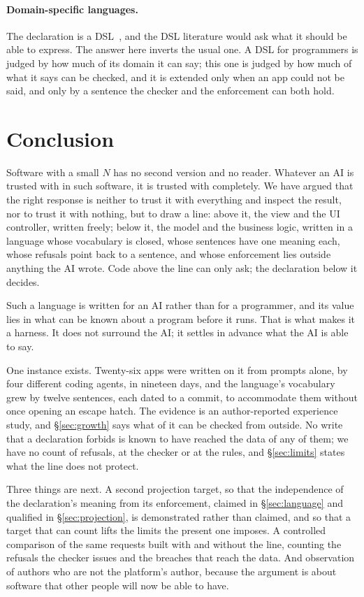 \documentclass[11pt]{article}
\begin{document}
\paragraph{Domain-specific languages.} The declaration is a DSL~\cite{mernik2005dsl,fowler2010dsl}, and the DSL literature would ask what it should be able to express. The answer here inverts the usual one. A DSL for programmers is judged by how much of its domain it can say; this one is judged by how much of what it says can be checked, and it is extended only when an app could not be said, and only by a sentence the checker and the enforcement can both hold.

\section{Conclusion}
\label{sec:conclusion}

Software with a small $N$ has no second version and no reader. Whatever an AI is trusted with in such software, it is trusted with completely. We have argued that the right response is neither to trust it with everything and inspect the result, nor to trust it with nothing, but to draw a line: above it, the view and the UI controller, written freely; below it, the model and the business logic, written in a language whose vocabulary is closed, whose sentences have one meaning each, whose refusals point back to a sentence, and whose enforcement lies outside anything the AI wrote. Code above the line can only ask; the declaration below it decides.

Such a language is written for an AI rather than for a programmer, and its value lies in what can be known about a program before it runs. That is what makes it a harness. It does not surround the AI; it settles in advance what the AI is able to say.

One instance exists. Twenty-six apps were written on it from prompts alone, by four different coding agents, in nineteen days, and the language's vocabulary grew by twelve sentences, each dated to a commit, to accommodate them without once opening an escape hatch. The evidence is an author-reported experience study, and \S\ref{sec:growth} says what of it can be checked from outside. No write that a declaration forbids is known to have reached the data of any of them; we have no count of refusals, at the checker or at the rules, and \S\ref{sec:limits} states what the line does not protect.

Three things are next. A second projection target, so that the independence of the declaration's meaning from its enforcement, claimed in \S\ref{sec:language} and qualified in \S\ref{sec:projection}, is demonstrated rather than claimed, and so that a target that can count lifts the limits the present one imposes. A controlled comparison of the same requests built with and without the line, counting the refusals the checker issues and the breaches that reach the data. And observation of authors who are not the platform's author, because the argument is about software that other people will now be able to have.
\end{document}
